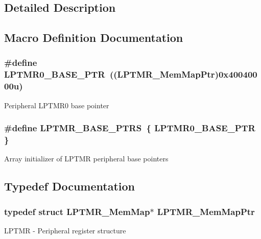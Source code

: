 \subsection{Detailed Description}


\subsection{Macro Definition Documentation}
\hypertarget{group___l_p_t_m_r___peripheral_ga90a9194151ad11b422bcab162e797eda}{}
\subsubsection[{L\+P\+T\+M\+R0\+\_\+\+B\+A\+S\+E\+\_\+\+P\+T\+R}]{\setlength{\rightskip}{0pt plus 5cm}\#define L\+P\+T\+M\+R0\+\_\+\+B\+A\+S\+E\+\_\+\+P\+T\+R~(({\bf L\+P\+T\+M\+R\+\_\+\+Mem\+Map\+Ptr})0x40040000u)}\label{group___l_p_t_m_r___peripheral_ga90a9194151ad11b422bcab162e797eda}
Peripheral L\+P\+T\+M\+R0 base pointer \hypertarget{group___l_p_t_m_r___peripheral_gac92660dedc63be48d689d43efc9f2c82}{}
\subsubsection[{L\+P\+T\+M\+R\+\_\+\+B\+A\+S\+E\+\_\+\+P\+T\+R\+S}]{\setlength{\rightskip}{0pt plus 5cm}\#define L\+P\+T\+M\+R\+\_\+\+B\+A\+S\+E\+\_\+\+P\+T\+R\+S~\{ {\bf L\+P\+T\+M\+R0\+\_\+\+B\+A\+S\+E\+\_\+\+P\+T\+R} \}}\label{group___l_p_t_m_r___peripheral_gac92660dedc63be48d689d43efc9f2c82}
Array initializer of L\+P\+T\+M\+R peripheral base pointers 

\subsection{Typedef Documentation}
\hypertarget{group___l_p_t_m_r___peripheral_ga765226e2eeb35160c12820d4a2541320}{}
\subsubsection[{L\+P\+T\+M\+R\+\_\+\+Mem\+Map\+Ptr}]{\setlength{\rightskip}{0pt plus 5cm}typedef struct {\bf L\+P\+T\+M\+R\+\_\+\+Mem\+Map}$\ast$ {\bf L\+P\+T\+M\+R\+\_\+\+Mem\+Map\+Ptr}}\label{group___l_p_t_m_r___peripheral_ga765226e2eeb35160c12820d4a2541320}
L\+P\+T\+M\+R -\/ Peripheral register structure 